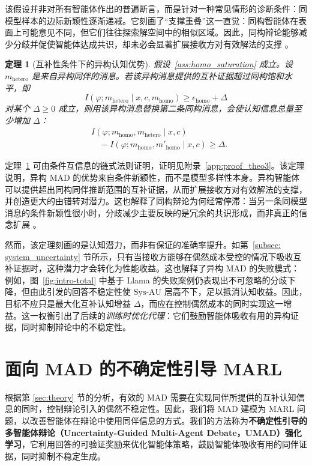 \documentclass{article}
\theoremstyle{plain}
\newtheorem{theorem}{定理}[section]
\theoremstyle{definition}
\theoremstyle{remark}
\begin{document}
该假设并非对所有智能体作出的普遍断言，而是针对一种常见情形的诊断条件：同模型样本的边际新颖性逐渐递减。它刻画了“支撑重叠”这一直觉：同构智能体在表面上可能意见不同，但它们往往探索解空间中的相似区域。因此，同构辩论能够减少分歧并促使智能体达成共识，却未必会显著扩展接收方对有效解法的支撑 \cite{choi2025debate, zhang2025if, wynn2025talk}。


\begin{theorem}[互补性条件下的异构认知优势]\label{thm:hetero_gain}
假设~\ref{ass:homo_saturation} 成立。设 $m_{\mathrm{hetero}}$ 是来自异构同伴的消息。若该异构消息提供的互补证据超过同构饱和水平，即
\[
I(\varphi; m_{\mathrm{hetero}} \mid x,c,m_{\mathrm{homo}})
\ge
\epsilon_{\mathrm{homo}} + \Delta
\]
对某个 $\Delta \ge 0$ 成立，则用该异构消息替换第二条同构消息，会使认知信息总量至少增加 $\Delta$：
\[
\begin{aligned}
&I(\varphi; m_{\mathrm{homo}},m_{\mathrm{hetero}} \mid x,c) \\
&\quad - I(\varphi; m_{\mathrm{homo}},m'_{\mathrm{homo}} \mid x,c)
\ge \Delta.
\end{aligned}
\]
\end{theorem}

定理~\ref{thm:hetero_gain} 可由条件互信息的链式法则证明，证明见附录~\ref{app:proof_theo3}。该定理说明，异构 MAD 的优势来自条件新颖性，而不是模型多样性本身。异构智能体可以提供超出同构同伴推断范围的互补证据，从而扩展接收方对有效解法的支撑，并创造更大的由错转对潜力。这也解释了同构辩论为何经常停滞：当另一条同模型消息的条件新颖性很小时，分歧减少主要反映的是冗余的共识形成，而非真正的信念扩展 \cite{wynn2025talk}。


然而，该定理刻画的是认知潜力，而非有保证的准确率提升。如第~\ref{subsec: system_uncertainty} 节所示，只有当接收方能够在偶然成本受控的情况下吸收互补证据时，这种潜力才会转化为性能收益。这也解释了异构 MAD 的失败模式：例如，图~\ref{fig:intro-total} 中基于 Llama 的失败案例仍表现出不可忽略的分歧下降，但由此引发的回答不稳定性使 $\mathrm{Sys\mbox{-}AU}$ 居高不下，足以抵消认知收益。因此，目标不应只是最大化互补认知增益 $\Delta$，而应在控制偶然成本的同时实现这一增益。这一权衡引出了后续的\emph{训练时优化代理}：它们鼓励智能体吸收有用的异构证据，同时抑制辩论中的不稳定性。

   

\section{面向 MAD 的不确定性引导 MARL}
\label{sec:method}

根据第 \ref{sec:theory} 节的分析，有效的 MAD 需要在实现同伴所提供的互补认知信息的同时，控制辩论引入的偶然不稳定性。因此，我们将 MAD 建模为 MARL 问题，以改善智能体在辩论中使用同伴信息的方式。我们的方法称为\textbf{不确定性引导的多智能体辩论（Uncertainty-Guided Multi-Agent Debate，UMAD）强化学习}，它利用回答的可验证奖励来优化智能体策略，鼓励智能体吸收有用的同伴证据，同时抑制不稳定生成。
\end{document}
